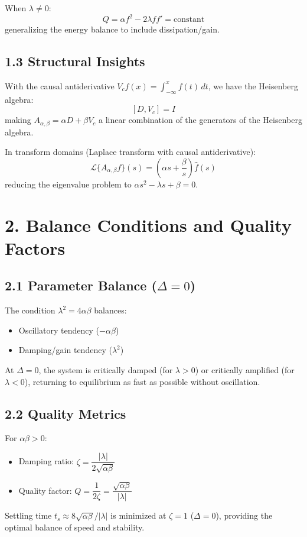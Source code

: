 \documentclass[11pt]{article}
\begin{document}
When $\lambda \neq 0$:
$$
Q = \alpha f^2 - 2\lambda f f' = \text{constant}
$$
generalizing the energy balance to include dissipation/gain.

\subsection{1.3 Structural Insights}
With the causal antiderivative $V_c f(x) = \int_{-\infty}^x f(t)\,dt$, we have the Heisenberg algebra:
$$
[D, V_c] = I
$$
making $A_{\alpha,\beta} = \alpha D + \beta V_c$ a linear combination of the generators of the Heisenberg algebra.

In transform domains (Laplace transform with causal antiderivative):
$$
\mathcal{L}\{A_{\alpha,\beta} f\}(s) = \left(\alpha s + \frac{\beta}{s}\right) \hat{f}(s)
$$
reducing the eigenvalue problem to $\alpha s^2 - \lambda s + \beta = 0$.

\section{2. Balance Conditions and Quality Factors}

\subsection{2.1 Parameter Balance ($\Delta = 0$)}
The condition $\lambda^2 = 4\alpha\beta$ balances:
\begin{itemize}
\item Oscillatory tendency ($-\alpha\beta$)
\item Damping/gain tendency ($\lambda^2$)
\end{itemize}

At $\Delta = 0$, the system is critically damped (for $\lambda > 0$) or critically amplified (for $\lambda < 0$), returning to equilibrium as fast as possible without oscillation.

\subsection{2.2 Quality Metrics}
For $\alpha\beta > 0$:
\begin{itemize}
\item Damping ratio: $\zeta = \dfrac{|\lambda|}{2\sqrt{\alpha\beta}}$
\item Quality factor: $Q = \dfrac{1}{2\zeta} = \dfrac{\sqrt{\alpha\beta}}{|\lambda|}$
\end{itemize}

Settling time $t_s \approx 8\sqrt{\alpha\beta}/|\lambda|$ is minimized at $\zeta = 1$ ($\Delta = 0$), providing the optimal balance of speed and stability.
\end{document}
